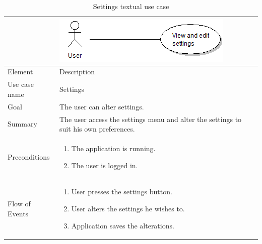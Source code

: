 \begin{table}
\begin{tabular}{p{3cm}p{12cm}}
& \includegraphics{settings}\\ \hline
Element & Description \\ \hline
Use case name & Settings \\
Goal & The user can alter settings. \\
Summary & The user access the settings menu and alter the settings to suit his own preferences. \\
Preconditions &
\begin{enumerate}
\item{}The application is running.
\item{}The user is logged in.
\end{enumerate} \\ \hline
Flow of Events &
\begin{enumerate}
\item{}User presses the settings button.
\item{}User alters the settings he wishes to.
\item{}Application saves the alterations.
\end{enumerate}
\end{tabular}
\caption{Settings textual use case} \label{tab:settings}
\end{table}